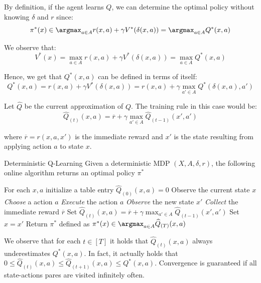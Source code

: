 \documentclass[a4paper, 12pt]{report}
\begin{document}
    By definition, if the agent learns $Q$, we can determine the optimal policy without knowing $\delta$ and $r$ since:
    \[\pi^*(x) \in \argmax_{a \in A} r(x,a) + \gamma V^*(\delta(x,a)) = \argmax_{a \in A} Q^*(x,a)\]

    We observe that:
    \[V^*(x) = \max_{a \in A} r(x,a) + \gamma V^*(\delta(x,a)) = \max_{a \in A} Q^*(x,a)\]

    Hence, we get that $Q^*(x,a)$ can be defined in terms of itself:
    \[Q^*(x,a) = r(x,a) + \gamma V^{*}(\delta(x,a)) = r(x,a) + \gamma \max_{a' \in A} Q^{*}(\delta(x,a), a')\]

    Let $\widehat{Q}$ be the current approximation of $Q$. The training rule in this case would be:
    \[\widehat{Q}_{(t)}(x,a) = \overline{r} + \gamma \max_{a' \in A} \widehat{Q}_{(t-1)}(x', a')\]

    where $\overline{r} = r(x, a, x')$ is the immediate reward and $x'$ is the state resulting from applying action $a$ to state $x$.

    \begin{framedalgo}{Deterministic Q-Learning}
        Given a deterministic MDP $(X, A, \delta, r)$, the following online algorithm returns an optimal policy $\pi^*$
        \begin{algorithmic}
                \State For each $x,a$ initialize a table entry $\widehat{Q}_{(0)}(x,a) = 0$
                \State Observe the current state $x$
                 
                    \State \textit{Choose} a action $a$ 
                    \State \textit{Execute} the action $a$
                    \State \textit{Observe} the new state $x'$
                    \State \textit{Collect} the immediate reward $\overline{r}$
                    \State Set $\widehat{Q}_{(t)}(x,a) = \overline{r} + \gamma \max_{a' \in A} \widehat{Q}_{(t-1)}(x', a')$ 
                    \State Set $x = x'$
                \EndFor
                \State Return $\pi^*$ defined as $\pi^*(x) \in \argmax_{a \in A} \widehat{Q}_{(T)}(x,a)$
            \EndFunction
        \end{algorithmic}
    \end{framedalgo}

    We observe that for each $t \in [T]$ it holds that $\widehat{Q}_{(t)}(x,a)$ always underestimates $Q^*(x,a)$. In fact, it actually holds that $0 \leq \widehat{Q}_{(t)}(x,a) \leq \widehat{Q}_{(t+1)}(x,a) \leq Q^*(x,a)$. Convergence is guaranteed if all state-actions pares are visited infinitely often.
\end{document}
